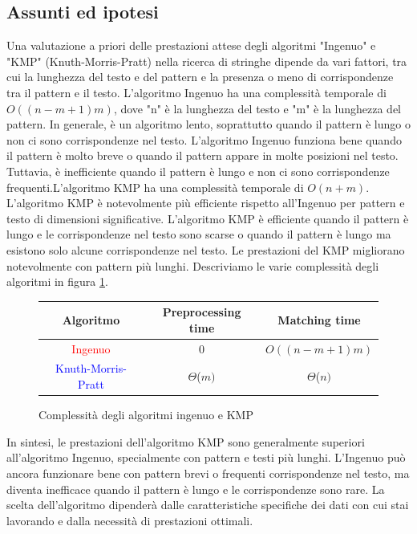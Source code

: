 \subsection{Assunti ed ipotesi}
\label{sec:AssuntiEdIpotesi_1}
Una valutazione a priori delle prestazioni attese degli algoritmi "Ingenuo" e "KMP" (Knuth-Morris-Pratt) nella ricerca di stringhe dipende da vari fattori, tra cui la lunghezza del testo e del pattern e la presenza o meno di corrispondenze tra il pattern e il testo.  L'algoritmo Ingenuo ha una complessità temporale di $O((n - m + 1)m)$, dove "n" è la lunghezza del testo e "m" è la lunghezza del pattern. In generale, è un algoritmo lento, soprattutto quando il pattern è lungo o non ci sono corrispondenze nel testo.
L'algoritmo Ingenuo funziona bene quando il pattern è molto breve o quando il pattern appare in molte posizioni nel testo. Tuttavia, è inefficiente quando il pattern è lungo e non ci sono corrispondenze frequenti.L'algoritmo KMP ha una complessità temporale di $O(n + m)$. L'algoritmo KMP è notevolmente più efficiente rispetto all'Ingenuo per pattern e testo di dimensioni significative. L'algoritmo KMP è efficiente quando il pattern è lungo e le corrispondenze nel testo sono scarse o quando il pattern è lungo ma esistono solo alcune corrispondenze nel testo. Le prestazioni del KMP migliorano notevolmente con pattern più lunghi. Descriviamo le varie complessità degli algoritmi in figura \ref{fig:ComplessitàIngenuoKmp}.

\begin{figure}[H]
    \centering
    \begin{tabular}{c|c|c}
        \hline
        Algoritmo & Preprocessing time & Matching time \\
        \hline
        \textcolor{red}{Ingenuo} & 0 & $O((n - m + 1)m)$ \\
        \hline
        \textcolor{blue}{Knuth-Morris-Pratt} & $\Theta$($m)$ & $\Theta$($n)$\\
        \hline
    \end{tabular}
    \caption{Complessità degli algoritmi ingenuo e KMP}
    \label{fig:ComplessitàIngenuoKmp}
\end{figure}

In sintesi, le prestazioni dell'algoritmo KMP sono generalmente superiori all'algoritmo Ingenuo, specialmente con pattern e testi più lunghi. L'Ingenuo può ancora funzionare bene con pattern brevi o frequenti corrispondenze nel testo, ma diventa inefficace quando il pattern è lungo e le corrispondenze sono rare. La scelta dell'algoritmo dipenderà dalle caratteristiche specifiche dei dati con cui stai lavorando e dalla necessità di prestazioni ottimali.

